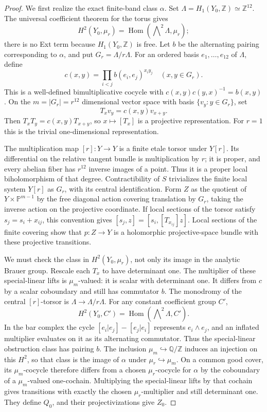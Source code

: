 \documentclass[11pt]{article}
\newcommand{\Q}{\mathbb Q}
\newcommand{\Z}{\mathbb Z}
\numberwithin{equation}{section}
\begin{document}
\begin{proof}
We first realize the exact finite-band class \(\alpha\).  Set
\(\Lambda=H_1(Y_0,\Z)\simeq\Z^{12}\).  The universal coefficient
theorem for the torus gives
\[
 H^2(Y_0,\mu_r)=\operatorname{Hom}(\mathop{\bigwedge}\nolimits^2\Lambda,\mu_r);
\]
there is no Ext term because \(H_1(Y_0,\Z)\) is free.  Let \(b\) be
the alternating pairing corresponding to \(\alpha\), and put
\(G_r=\Lambda/r\Lambda\).  For an ordered basis \(e_1,\ldots,e_{12}\)
of \(\Lambda\), define
\[
 c(x,y)=\prod_{i<j}b(e_i,e_j)^{x_i y_j}\quad(x,y\in G_r).
\]
This is a well-defined bimultiplicative cocycle with
\(c(x,y)c(y,x)^{-1}=b(x,y)\).  On the \(m=|G_r|=r^{12}\)
dimensional vector space with basis \(\{v_y:y\in G_r\}\), set
\[
 T_xv_y=c(x,y)v_{x+y}.
\]
Then \(T_xT_y=c(x,y)T_{x+y}\), so \(x\mapsto[T_x]\) is a
projective representation.  For \(r=1\) this is the trivial
one-dimensional representation.

The multiplication map \([r]:Y\to Y\) is a finite etale torsor
under \(Y[r]\).  Its differential on the relative tangent bundle is
multiplication by \(r\); it is proper, and every abelian fiber has
\(r^{12}\) inverse images of a point.  Thus it is a proper local
biholomorphism of that degree.  Contractibility of \(S\) trivializes
the finite local system \(Y[r]\) as \(G_r\), with its central
identification.  Form \(Z\) as the quotient of
\(Y\times\mathbb P^{m-1}\) by the free diagonal action covering
translation by \(G_r\), taking the inverse action on the projective
coordinate.  If local sections of the torsor satisfy
\(s_j=s_i+x_{ij}\), this convention gives
\([s_j,z]=[s_i,[T_{x_{ij}}]z]\).  Local sections of the finite
covering show that \(p:Z\to Y\) is a holomorphic projective-space
bundle with these projective transitions.

We must check the class in \(H^2(Y_0,\mu_r)\), not only its image in
the analytic Brauer group.  Rescale each \(T_x\) to have determinant
one.  The multiplier of these special-linear lifts is \(\mu_m\)-valued:
it is scalar with determinant one.  It differs from \(c\) by a scalar
coboundary and still has commutator \(b\).  The monodromy of the
central \([r]\)-torsor is \(\Lambda\to\Lambda/r\Lambda\).
For any constant coefficient group \(C'\),
\[
 H^2(Y_0,C')=\operatorname{Hom}(\mathop{\bigwedge}\nolimits^2\Lambda,C').
\]
In the bar complex the cycle
\([e_i|e_j]-[e_j|e_i]\) represents \(e_i\wedge e_j\), and an
inflated multiplier evaluates on it as its alternating commutator.
Thus the special-linear obstruction class has pairing \(b\).  The
inclusion \(\mu_m\hookrightarrow\Q/\Z\) induces an injection on
this \(H^2\), so that class is the image of \(\alpha\) under
\(\mu_r\hookrightarrow\mu_m\).  On a common good cover, its
\(\mu_m\)-cocycle therefore differs from a chosen \(\mu_r\)-cocycle
for \(\alpha\) by the coboundary of a \(\mu_m\)-valued one-cochain.
Multiplying the special-linear lifts by that cochain gives transitions
with exactly the chosen \(\mu_r\)-multiplier and still determinant
one.  They define \(Q_0\), and their projectivizations give \(Z_0\).


\end{proof}
\end{document}
